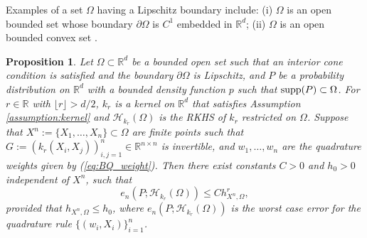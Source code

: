 \documentclass[11pt]{article}
\newtheorem{proposition}[theorem]{Proposition}
\theoremstyle{remark}
\theoremstyle{example}
\theoremstyle{remark}
\renewcommand{\H}{{\mathcal{H}}}
\newcommand{\R}{\mathbb{R}}
\newcommand{\citep}{\cite}
\begin{document}
Examples of a set $\Omega$ having a Lipschitz boundary include: (i) $\Omega$ is an open bounded set whose boundary $\partial \Omega$ is $C^1$ embedded in $\R^d$; 
(ii) $\Omega$ is an open bounded convex set \citep[p.189]{Ste70}.

%
\begin{proposition} \label{prop:BQ_fill}
Let $\Omega \subset \R^d$ be a bounded open set such that an interior cone condition is satisfied and the boundary $\partial\Omega$ is Lipschitz, and $P$ be a probability distribution on $\R^d$ with a bounded density function $p$ such that ${\rm supp}(P) \subset \Omega$.
For $r\in\R$ with $\lfloor r \rfloor > d/2$, $k_r$ is a kernel on $\R^d$ that satisfies Assumption \ref{assumption:kernel} and $\H_{k_r}(\Omega)$ is the RKHS of $k_r$ restricted on $\Omega$.
Suppose that $X^n := \{X_1,\dots,X_n\} \subset \Omega$ are finite points such that $G := (k_r(X_i,X_j))_{i,j=1}^n \in \R^{n \times n}$ is invertible, and $w_1,\dots,w_n$ are the quadrature weights given by (\ref{eq:BQ_weight}).
Then there exist constants $C > 0$ and $h_0 > 0$ independent of $X^n$, such that 
\[ 
e_n(P; \H_{k_r}(\Omega))  \leq C h_{X^n,\Omega}^r,
\]
provided that $h_{X^n,\Omega} \leq h_0$, where $e_n(P; \H_{k_r}(\Omega))$ is the worst case error for the quadrature rule $\{ (w_i,X_i) \}_{i=1}^n$.
\end{proposition}
\end{document}
